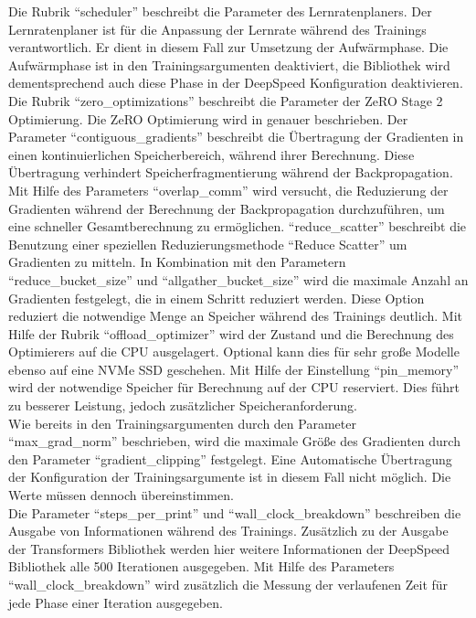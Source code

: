 Die Rubrik \enquote{scheduler} beschreibt die Parameter des Lernratenplaners. Der Lernratenplaner ist für die Anpassung der Lernrate während des Trainings verantwortlich.
Er dient in diesem Fall zur Umsetzung der Aufwärmphase. Die Aufwärmphase ist in den Trainingsargumenten deaktiviert, die Bibliothek wird dementsprechend auch diese Phase in der DeepSpeed Konfiguration deaktivieren.\\

Die Rubrik \enquote{zero\_optimizations} beschreibt die Parameter der ZeRO Stage 2 Optimierung.
Die ZeRO Optimierung wird in \citet{deepspeed} genauer beschrieben.
Der Parameter \enquote{contiguous\_gradients} beschreibt die Übertragung der Gradienten in einen kontinuierlichen Speicherbereich, während ihrer Berechnung.
Diese Übertragung verhindert Speicherfragmentierung während der Backpropagation.
Mit Hilfe des Parameters \enquote{overlap\_comm} wird versucht, die Reduzierung der Gradienten während der Berechnung der Backpropagation durchzuführen, um eine schneller Gesamtberechnung zu ermöglichen.
\enquote{reduce\_scatter} beschreibt die Benutzung einer speziellen Reduzierungsmethode \enquote{Reduce Scatter} um Gradienten zu mitteln.
In Kombination mit den Parametern \enquote{reduce\_bucket\_size} und \enquote{allgather\_bucket\_size} wird die maximale Anzahl an Gradienten festgelegt, die in einem Schritt reduziert werden.
Diese Option reduziert die notwendige Menge an Speicher während des Trainings deutlich.
Mit Hilfe der Rubrik \enquote{offload\_optimizer} wird der Zustand  und die Berechnung des Optimierers auf die CPU ausgelagert.
Optional kann dies für sehr große Modelle ebenso auf eine NVMe SSD geschehen.
Mit Hilfe der Einstellung \enquote{pin\_memory} wird der notwendige Speicher für Berechnung auf der CPU reserviert.
Dies führt zu besserer Leistung, jedoch zusätzlicher Speicheranforderung.\\

Wie bereits in den Trainingsargumenten durch den Parameter \enquote{max\_grad\_norm} beschrieben, wird die maximale Größe des Gradienten durch den Parameter \enquote{gradient\_clipping} festgelegt.
Eine Automatische Übertragung der Konfiguration der Trainingsargumente ist in diesem Fall nicht möglich.
Die Werte müssen dennoch übereinstimmen.\\

Die Parameter \enquote{steps\_per\_print} und \enquote{wall\_clock\_breakdown} beschreiben die Ausgabe von Informationen während des Trainings.
Zusätzlich zu der Ausgabe der Transformers Bibliothek werden hier weitere Informationen der DeepSpeed Bibliothek alle 500 Iterationen ausgegeben.
Mit Hilfe des Parameters \enquote{wall\_clock\_breakdown} wird zusätzlich die Messung der verlaufenen Zeit für jede Phase einer Iteration ausgegeben.\\

